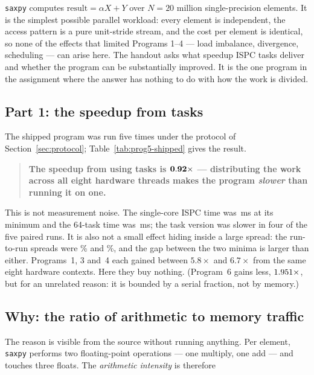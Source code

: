 \documentclass[11pt,a4paper]{article}
\newcommand{\ms}[1]{#1\,ms}
\begin{document}
\texttt{saxpy} computes $\text{result} = \alpha X + Y$ over $N = 20$ million
single-precision elements. It is the simplest possible parallel workload:
every element is independent, the access pattern is a pure unit-stride stream,
and the cost per element is identical, so none of the effects that limited
Programs 1--4 --- load imbalance, divergence, scheduling --- can arise here.
The handout asks what speedup ISPC tasks deliver and whether the program can be
substantially improved. It is the one program in the assignment where the
answer has nothing to do with how the work is divided.

\subsection{Part 1: the speedup from tasks}

The shipped program was run five times under the protocol of
Section~\ref{sec:protocol}; Table~\ref{tab:prog5-shipped} gives the result.

\prognFiveTableShipped

\begin{quote}
\textbf{The speedup from using tasks is $\mathbf{0.92\times}$
--- distributing the work across all eight hardware threads makes the program
\emph{slower} than running it on one.}
\end{quote}

This is not measurement noise. The single-core ISPC time was
\ms{\prognFiveShippedIspcMs} at its minimum and the 64-task time was
\ms{\prognFiveShippedTaskMs}; the task version was slower in four of the five
paired runs. It is also not a small effect hiding inside a large spread: the
run-to-run spreads were \prognFiveIspcSpread\% and \prognFiveTaskSpread\%, and
the gap between the two minima is larger than either. Programs~1, 3 and~4 each gained between
$5.8\times$ and $6.7\times$ from the same eight hardware contexts. Here they
buy nothing. (Program~6 gains less, $1.951\times$, but for an
unrelated reason: it is bounded by a serial fraction, not by memory.)

\subsection{Why: the ratio of arithmetic to memory traffic}

The reason is visible from the source without running anything. Per element,
\texttt{saxpy} performs two floating-point operations --- one multiply, one add
--- and touches three floats. The \emph{arithmetic intensity} is therefore
\end{document}
